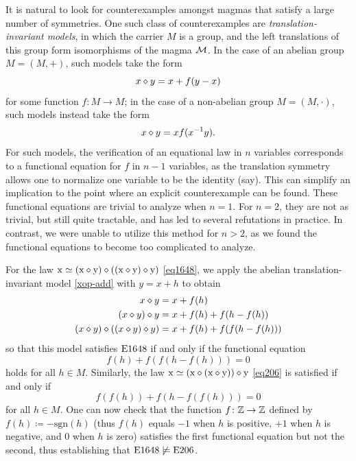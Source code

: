 It is natural to look for counterexamples amongst magmas that satisfy a large number of symmetries.  One such class of counterexamples are \emph{translation-invariant models}, in which the carrier $M$ is a group, and the left translations of this group form isomorphisms of the magma ${\mathcal{M}}$.  In the case of an abelian group $M = (M,+)$, such models take the form
\begin{equation}\label{xop-add}
  x \diamond y = x + f(y-x)
\end{equation}
for some function $f \colon M \to M$; in the case of a non-abelian group $M = (M,\cdot)$, such models instead take the form
\begin{equation*}
x \diamond y = x f(x^{-1} y).
\end{equation*}
For such models, the verification of an equational law in $n$ variables corresponds to a functional equation for $f$ in $n-1$ variables, as the translation symmetry allows one to normalize one variable to be the identity (say). This can simplify an implication to the point where an explicit counterexample can be found.  These functional equations are trivial to analyze when $n=1$.  For $n=2$, they are not as trivial, but still quite tractable, and has led to several refutations in practice.  In contrast, we were unable to utilize this method for $n>2$, as we found the functional equations to become too complicated to analyze.

\begin{example}\label{abex}  For the law $\mathrm{x} \simeq (\mathrm{x} \diamond \mathrm{y}) \diamond ((\mathrm{x} \diamond \mathrm{y}) \diamond \mathrm{y})$ \eqref{eq1648}, we apply the abelian translation-invariant model \eqref{xop-add} with $y=x+h$ to obtain
\begin{align*}
  x \diamond y &= x + f(h) \\
  (x \diamond y) \diamond y &= x + f(h) + f(h-f(h)) \\
  (x \diamond y) \diamond ((x \diamond y) \diamond y) &= x + f(h) + f(f(h-f(h)))
\end{align*}
so that this model satisfies $\mathrm{E}1648$ if and only if the functional equation
$$f(h) + f(f(h-f(h))) = 0$$
holds for all $h \in M$.  Similarly, the law $\mathrm{x} \simeq (\mathrm{x} \diamond (\mathrm{x} \diamond \mathrm{y})) \diamond \mathrm{y}$ \eqref{eq206} is satisfied if and only if
$$ f(f(h)) + f(h - f(f(h))) = 0$$
for all $h \in M$.  One can now check that the function $f \colon \mathbb{Z} \to \mathbb{Z}$ defined by $f(h) \coloneqq - \mathrm{sgn}(h)$ (thus $f(h)$ equals $-1$ when $h$ is positive, $+1$ when $h$ is negative, and $0$ when $h$ is zero) satisfies the first functional equation but not the second, thus establishing that $\mathrm{E}1648 \not\models \mathrm{E}206$.
\end{example}


